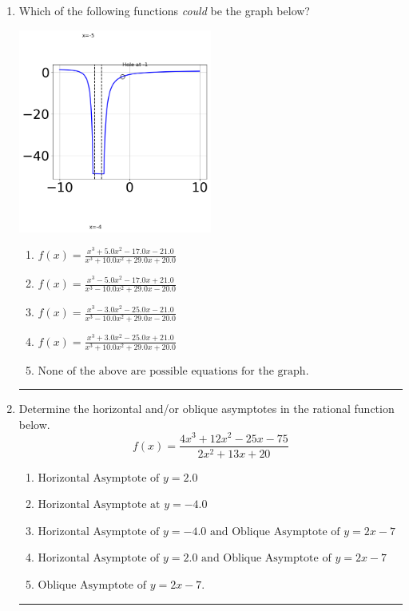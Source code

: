 \documentclass[14pt]{extbook}
\newcommand{\litem}[1]{\item#1\hspace*{-1cm}\rule{\textwidth}{0.4pt}}
\begin{document}
\begin{enumerate}
{\begin{enumerate}[label=\Alph*.]
\end{enumerate} }
\litem{
Which of the following functions \textit{could} be the graph below?
\begin{center}
    \includegraphics[width=0.5\textwidth]{../Figures/identifyGraphOfRationalFunctionCopyB.png}
\end{center}
\begin{enumerate}[label=\Alph*.]
\item \( f(x)=\frac{x^{3} +5.0 x^{2} -17.0 x -21.0}{x^{3} +10.0 x^{2} +29.0 x + 20.0} \)
\item \( f(x)=\frac{x^{3} -5.0 x^{2} -17.0 x + 21.0}{x^{3} -10.0 x^{2} +29.0 x -20.0} \)
\item \( f(x)=\frac{x^{3} -3.0 x^{2} -25.0 x -21.0}{x^{3} -10.0 x^{2} +29.0 x -20.0} \)
\item \( f(x)=\frac{x^{3} +3.0 x^{2} -25.0 x + 21.0}{x^{3} +10.0 x^{2} +29.0 x + 20.0} \)
\item \( \text{None of the above are possible equations for the graph.} \)

\end{enumerate} }
\litem{
Determine the horizontal and/or oblique asymptotes in the rational function below.\[ f(x) = \frac{4x^{3} +12 x^{2} -25 x -75}{2x^{2} +13 x + 20} \]\begin{enumerate}[label=\Alph*.]
\item \( \text{Horizontal Asymptote of } y = 2.0  \)
\item \( \text{Horizontal Asymptote at } y = -4.0 \)
\item \( \text{Horizontal Asymptote of } y = -4.0 \text{ and Oblique Asymptote of } y = 2x -7 \)
\item \( \text{Horizontal Asymptote of } y = 2.0 \text{ and Oblique Asymptote of } y = 2x -7 \)
\item \( \text{Oblique Asymptote of } y = 2x -7. \)


\end{enumerate}}
\end{enumerate}
\end{document}
